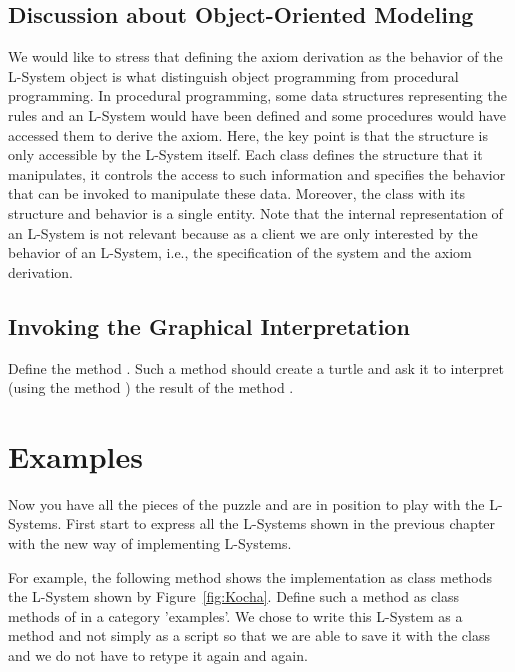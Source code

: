 \subsection{Discussion about Object-Oriented Modeling}
We would like to stress that defining the axiom derivation as the
behavior of the L-System object is what distinguish object programming
from procedural programming. In procedural programming, some data
structures representing the rules and an L-System would have been
defined and some procedures would have accessed them to derive the
axiom. Here, the key point is that the structure is only accessible by
the L-System itself. Each class defines the structure that it
manipulates, it controls the access to such information and specifies
the behavior that can be invoked to manipulate these data. Moreover,
the class with its structure and behavior is a single entity.  Note
that the internal representation of an L-System is not relevant
because as a client we are only interested by the behavior of an
L-System, i.e., the specification of the system and the axiom
derivation.


\subsection{Invoking the Graphical Interpretation}
Define the method . Such a method should
create a turtle and ask it to interpret (using the method
) the result of the method
.




\section{Examples}
Now you have all the pieces of the puzzle and are in position to play with the L-Systems. First start to express all the L-Systems shown in the
previous chapter with the new way of implementing L-Systems. 

For example, the following method shows the implementation as class
methods the L-System shown by Figure~\ref{fig:Kocha}.  Define such
a method as class methods of  in a category 'examples'.
We chose to write this L-System as a method and not simply as a script
so that we are able to save it with the class and we do not have to
retype it again and again.

